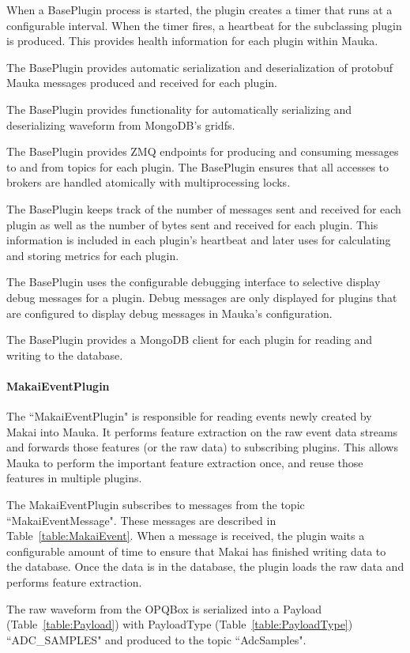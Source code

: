 When a BasePlugin process is started, the plugin creates a timer that runs at a configurable interval. When the timer fires, a heartbeat for the subclassing plugin is produced. This provides health information for each plugin within Mauka.

The BasePlugin provides automatic serialization and deserialization of protobuf Mauka messages produced and received for each plugin.

The BasePlugin provides functionality for automatically serializing and deserializing waveform from MongoDB's gridfs.

The BasePlugin provides ZMQ endpoints for producing and consuming messages to and from topics for each plugin. The BasePlugin ensures that all accesses to brokers are handled atomically with multiprocessing locks.

The BasePlugin keeps track of the number of messages sent and received for each plugin as well as the number of bytes sent and received for each plugin. This information is included in each plugin's heartbeat and later uses for calculating and storing metrics for each plugin.

The BasePlugin uses the configurable debugging interface to selective display debug messages for a plugin. Debug messages are only displayed for plugins that are configured to display debug messages in Mauka's configuration.

The BasePlugin provides a MongoDB client for each plugin for reading and writing to the database.

\paragraph{MakaiEventPlugin} The ``MakaiEventPlugin" is responsible for reading events newly created by Makai into Mauka. It performs feature extraction on the raw event data streams and forwards those features (or the raw data) to subscribing plugins. This allows Mauka to perform the important feature extraction once, and reuse those features in multiple plugins.

The MakaiEventPlugin subscribes to messages from the topic ``MakaiEventMessage". These messages are described in Table~\ref{table:MakaiEvent}. When a message is received, the plugin waits a configurable amount of time to ensure that Makai has finished writing data to the database. Once the data is in the database, the plugin loads the raw data and performs feature extraction.

The raw waveform from the OPQBox is serialized into a Payload (Table~\ref{table:Payload}) with PayloadType (Table~\ref{table:PayloadType}) ``ADC\_SAMPLES" and produced to the topic ``AdcSamples".

